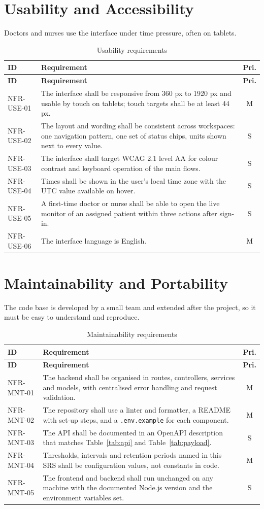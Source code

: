 \documentclass[a4paper,11pt]{scrreprt}
\makeatletter
\newenvironment{reqtable}[1]{%
  \small
  \begin{longtable}{@{}>{\ttfamily\footnotesize}p{2.55cm}>{\raggedright\arraybackslash}p{10.7cm}c@{}}
  \caption{#1}\\
  \toprule \textbf{ID} & \textbf{Requirement} & \textbf{Pri.}\\ \midrule
  \endfirsthead
  \toprule \textbf{ID} & \textbf{Requirement} & \textbf{Pri.}\\ \midrule
  \endhead
  \bottomrule
  \endfoot
}{%
  \end{longtable}\normalsize
}
\newcommand{\req}[3]{#1 & #2 & #3 \\ \midrule}
\newcommand{\code}[1]{\texttt{#1}}
\makeatother
\begin{document}
\section{Usability and Accessibility}
Doctors and nurses use the interface under time pressure, often on tablets.
\begin{reqtable}{Usability requirements}
\req{NFR-USE-01}{The interface shall be responsive from 360 px to 1920 px and usable by touch on tablets; touch targets shall be at least 44 px.}{M}
\req{NFR-USE-02}{The layout and wording shall be consistent across workspaces: one navigation pattern, one set of status chips, units shown next to every value.}{S}
\req{NFR-USE-03}{The interface shall target WCAG 2.1 level AA for colour contrast and keyboard operation of the main flows.}{S}
\req{NFR-USE-04}{Times shall be shown in the user's local time zone with the UTC value available on hover.}{S}
\req{NFR-USE-05}{A first-time doctor or nurse shall be able to open the live monitor of an assigned patient within three actions after sign-in.}{S}
\req{NFR-USE-06}{The interface language is English.}{M}
\end{reqtable}

\section{Maintainability and Portability}
The code base is developed by a small team and extended after the project, so it must be easy to understand and reproduce.
\begin{reqtable}{Maintainability requirements}
\req{NFR-MNT-01}{The backend shall be organised in routes, controllers, services and models, with centralised error handling and request validation.}{M}
\req{NFR-MNT-02}{The repository shall use a linter and formatter, a README with set-up steps, and a \code{.env.example} for each component.}{M}
\req{NFR-MNT-03}{The API shall be documented in an OpenAPI description that matches Table~\ref{tab:api} and Table~\ref{tab:payload}.}{S}
\req{NFR-MNT-04}{Thresholds, intervals and retention periods named in this SRS shall be configuration values, not constants in code.}{M}
\req{NFR-MNT-05}{The frontend and backend shall run unchanged on any machine with the documented Node.js version and the environment variables set.}{S}
\end{reqtable}
\end{document}
